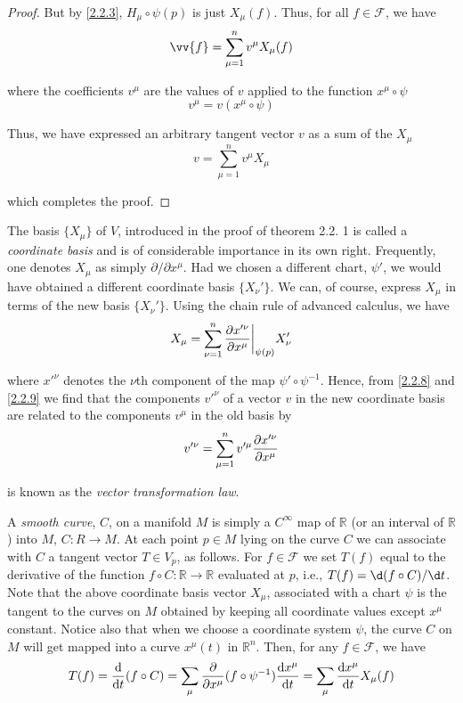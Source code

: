 \begin{proof}
But by \eqref{2.2.3}, $H_\mu\circ\psi(p)$ is just $X_\mu(f)$. Thus, for all $f\in\mathscr{F}$, we have
\begin{equation}
    \vv{f}=\sum_{\mu=1}^nv^\mu X_\mu(f)
    \label{2.2.6}
\end{equation}

where the coefficients $v^\mu$ are the values of $v$ applied to the function $x^\mu\circ\psi$
\begin{equation}
    v^\mu=v(x^\mu\circ\psi)
    \label{2.2.7}
\end{equation}

Thus, we have expressed an arbitrary tangent vector $v$ as a sum of the $X_\mu$
\begin{equation}
    v=\sum_{\mu=1}^nv^\mu X_\mu
    \label{2.2.8}
\end{equation}

which completes the proof.
\end{proof}

The basis $\{X_\mu\}$ of $V$, introduced in the proof of theorem 2.2. 1 is called a \emph{coordinate basis} and is of considerable importance in its own right. Frequently, one denotes $X_\mu$ as simply $\partial/\partial x^\mu$. Had we chosen a different chart, $\psi'$, we would have obtained a different coordinate basis $\{X_\nu'\}$. We can, of course, express $X_\mu$ in terms of the new basis $\{X_\nu'\}$. Using the chain rule of advanced calculus, we have
\begin{equation}
    X_\mu=\sum_{\nu=1}^n\pdv{x'^\nu}{x^\mu}\bigg|_{\psi(p)}X_\nu'
    \label{2.2.9}
\end{equation}

where $x'^\nu$ denotes the $\nu$th component of the map $\psi'\circ\psi^{-1}$. Hence, from \eqref{2.2.8} and \eqref{2.2.9} we find that the components $v'^\nu$ of a vector $v$ in the new coordinate basis are related to the components $v^\mu$ in the old basis by
\begin{equation}
    v'^\nu=\sum_{\mu=1}^nv'^\mu\pdv{x'^\nu}{x^\mu}
    \label{2.2.10}
\end{equation}

 is known as the \emph{vector transformation law}.

A \emph{smooth curve}, $C$, on a manifold $M$ is simply a $C^\infty$ map of $\mathbb{R}$ (or an interval of $\mathbb{R}$) into $M$, $C:R \to M$. At each point $p\in M$ lying on the curve $C$ we can associate with $C$ a tangent vector $T\in V_p$, as follows. For $f\in\mathscr{F}$ we set $T(f)$ equal to the derivative of the function $f\circ C:\mathbb{R}\to\mathbb{R}$ evaluated at $p$, i.e., $T(f)=\d(f\circ C)/\d t$. Note that the above coordinate basis vector $X_\mu$, associated with a chart $\psi$ is the tangent to the curves on $M$ obtained by keeping all coordinate values except $x^\mu$ constant. Notice also that when we choose a coordinate system $\psi$, the curve $C$ on $M$ will get mapped into a curve $x^\mu(t)$ in $\mathbb{R}^n$. Then, for any $f\in\mathscr{F}$, we have
\begin{equation}
    T(f)=\odv{}t(f\circ C)=\sum_\mu\pdv{}{x^\mu}(f\circ\psi^{-1})\odv{x^\mu}t=\sum_\mu\odv{x^\mu}tX_\mu(f)
    \label{2.2.11}
\end{equation}

